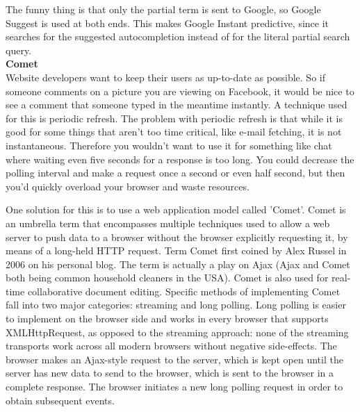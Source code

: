 The funny thing is that only the partial term is sent to Google, so Google Suggest is used at both ends. This makes Google Instant predictive, since it searches for the suggested autocompletion instead of for the literal partial search query.\\
	
\textbf{Comet}\\
Website developers want to keep their users as up-to-date as possible. So if someone comments on a picture you are viewing on Facebook, it would be nice to see a comment that someone typed in the meantime instantly. A technique used for this is periodic refresh. The problem with periodic refresh is that while it is good for some things that aren't too time critical, like e-mail fetching, it is not instantaneous. Therefore you wouldn't want to use it for something like chat where waiting even five seconds for a response is too long. You could decrease the polling interval and make a request once a second or even half second, but then you'd quickly overload your browser and waste resources.	
	
One solution for this is to use a web application model called 'Comet'. Comet is an umbrella term that encompasses multiple techniques  used to allow a web server to push data to a browser without the browser explicitly requesting it, by means of a long-held HTTP request. Term Comet first coined by Alex Russel in 2006 on his personal blog. The term is actually a play on Ajax (Ajax and Comet both being common household cleaners in the USA). Comet is also used for real-time collaborative document editing. Specific methods of implementing Comet fall into two major categories: streaming and long polling. Long polling is easier to implement on the browser side and works in every browser that supports XMLHttpRequest, as opposed to the streaming approach: none of the streaming transports work across all modern browsers without negative side-effects. The browser makes an Ajax-style request to the server, which is kept open until the server has new data to send to the browser, which is sent to the browser in a complete response. The browser initiates a new long polling request in order to obtain subsequent events.